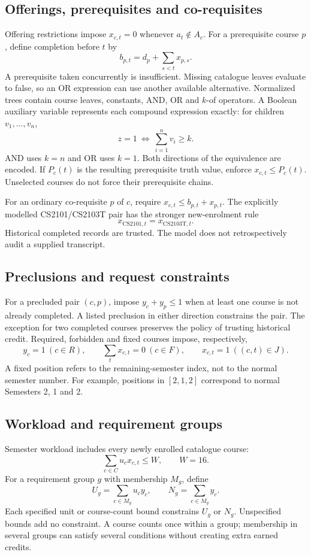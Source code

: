\documentclass[11pt,a4paper]{article}
\begin{document}
\subsection{Offerings, prerequisites and co-requisites}
Offering restrictions impose $x_{c,t}=0$ whenever $a_t\notin A_c$.
For a prerequisite course $p$, define completion before $t$ by
\[
 b_{p,t}=d_p+\sum_{s<t}x_{p,s}.
\]
A prerequisite taken concurrently is insufficient. Missing catalogue leaves
evaluate to false, so an OR expression can use another available alternative.
Normalized trees contain course leaves, constants, AND, OR and $k$-of
operators. A Boolean auxiliary variable represents each compound expression
exactly: for children $v_1,\ldots,v_n$,
\[
 z=1\ \Longleftrightarrow\ \sum_{i=1}^n v_i\geq k .
\]
AND uses $k=n$ and OR uses $k=1$. Both directions of the equivalence are
encoded. If $P_c(t)$ is the resulting prerequisite truth value, enforce
$x_{c,t}\leq P_c(t)$. Unselected courses do not force their prerequisite chains.

For an ordinary co-requisite $p$ of $c$, require
$x_{c,t}\leq b_{p,t}+x_{p,t}$. The explicitly modelled CS2101/CS2103T pair
has the stronger new-enrolment rule
\[
 x_{\mathrm{CS2101},t}=x_{\mathrm{CS2103T},t}.
\]
Historical completed records are trusted. The model does not retrospectively
audit a supplied transcript.

\subsection{Preclusions and request constraints}
For a precluded pair $(c,p)$, impose $y_c+y_p\leq1$ when at least one course
is not already completed. A listed preclusion in either direction constrains
the pair. The exception for two completed courses preserves the policy of
trusting historical credit.
Required, forbidden and fixed courses impose, respectively,
\[
 y_c=1\ (c\in R),\qquad
 \sum_t x_{c,t}=0\ (c\in F),\qquad
 x_{c,t}=1\ ((c,t)\in J).
\]
A fixed position refers to the remaining-semester index, not to the normal
semester number. For example, positions in $[2,1,2]$ correspond to normal
Semesters 2, 1 and 2.

\par
\subsection{Workload and requirement groups}
Semester workload includes every newly enrolled catalogue course:
\[
 \sum_{c\in C}u_c x_{c,t}\leq W,\qquad W=16 .
\]
For a requirement group $g$ with membership $M_g$, define
\[
 U_g=\sum_{c\in M_g}u_c y_c,\qquad N_g=\sum_{c\in M_g}y_c .
\]
Each specified unit or course-count bound constrains $U_g$ or $N_g$.
Unspecified bounds add no constraint. A course counts once within a group;
membership in several groups can satisfy several conditions without creating
extra earned credits.
\end{document}
